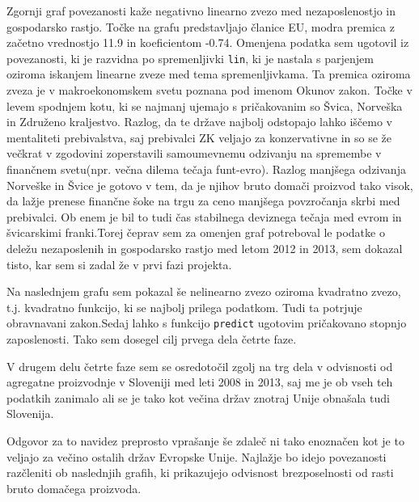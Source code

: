 \documentclass[11pt,a4paper]{article}
\begin{document}
Zgornji graf povezanosti kaže negativno linearno zvezo med nezaposlenostjo in gospodarsko rastjo. Točke na grafu predstavljajo članice EU, modra premica z začetno vrednostjo 11.9 in koeficientom -0.74. Omenjena podatka sem ugotovil iz povezanosti, ki je razvidna po spremenljivki \verb|lin|, ki je nastala s parjenjem oziroma iskanjem linearne zveze med tema spremenljivkama. Ta premica oziroma zveza je v makroekonomskem svetu poznana pod imenom Okunov zakon. Točke v levem spodnjem kotu, ki se najmanj ujemajo s pričakovanim so Švica, Norveška in Združeno kraljestvo. Razlog, da te države najbolj odstopajo lahko iščemo v mentaliteti prebivalstva, saj prebivalci ZK veljajo za konzervativne in so se že večkrat v zgodovini zoperstavili samoumevnemu odzivanju na spremembe v finančnem svetu(npr. večna dilema tečaja funt-evro). Razlog manjšega odzivanja Norveške in Švice je gotovo v tem, da je njihov bruto domači proizvod tako visok, da lažje prenese finančne šoke na trgu za ceno manjšega povzročanja skrbi med prebivalci. Ob enem je bil to tudi čas stabilnega deviznega tečaja med evrom in švicarskimi franki.Torej čeprav sem za omenjen graf potreboval le podatke o deležu nezaposlenih in gospodarsko rastjo med letom 2012 in 2013, sem dokazal tisto, kar sem si zadal že v prvi fazi projekta.

Na naslednjem grafu sem pokazal še nelinearno zvezo oziroma kvadratno zvezo, t.j. kvadratno funkcijo, ki se najbolj prilega podatkom. Tudi ta potrjuje obravnavani zakon.Sedaj lahko s funkcijo \verb|predict| ugotovim pričakovano stopnjo zaposlenosti. Tako sem dosegel cilj prvega dela četrte faze.


\pagebreak
V drugem delu četrte faze sem se osredotočil zgolj na trg dela v odvisnosti od agregatne proizvodnje v Sloveniji med leti 2008 in 2013, saj me je ob vseh teh podatkih zanimalo ali se je tako kot večina držav znotraj Unije obnašala tudi Slovenija. 

Odgovor za to navidez preprosto vprašanje še zdaleč ni tako enoznačen kot je to veljajo za večino ostalih držav Evropske Unije. Najlažje bo idejo povezanosti razčleniti ob naslednjih grafih, ki prikazujejo odvisnost brezposelnosti od rasti bruto domačega proizvoda.
\end{document}
